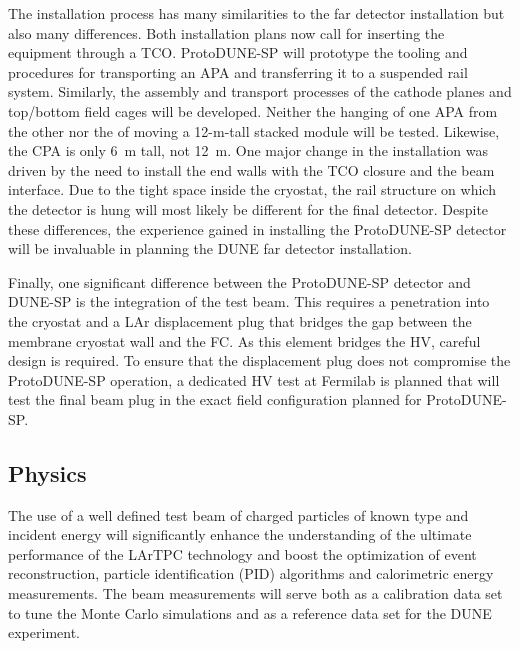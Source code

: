 
The installation process has many similarities to the far detector installation but also many differences. Both installation plans now call for inserting the equipment through a TCO. ProtoDUNE-SP will prototype the tooling and procedures for transporting an APA and transferring it to a suspended rail system. Similarly, the assembly and transport processes of the cathode planes and top/bottom field cages will be developed. %
Neither the hanging of one APA from the other nor the %
of moving a 12-m-tall stacked module %
will be tested. Likewise, the CPA is only 6~m tall, not 12~m. One major change in the installation was %
driven by the need to install the end walls with the TCO closure and the beam interface. 
Due to the tight space inside the cryostat, the rail structure on which the detector is hung will most likely be different for the final detector. Despite these differences, the experience gained in installing the ProtoDUNE-SP detector will be invaluable in planning the DUNE far detector installation. 

Finally, one significant difference between the ProtoDUNE-SP detector and DUNE-SP is the integration of the test beam. This requires a penetration into the cryostat and a LAr displacement plug that bridges the gap between the membrane cryostat wall and the FC. As this element bridges the HV, careful design is required. To ensure that the displacement plug does not compromise the ProtoDUNE-SP operation, a dedicated HV test at Fermilab is planned that will test the final beam plug in the exact field configuration planned for ProtoDUNE-SP.

\subsection{Physics}


The use of a well defined test beam of charged particles of known type and incident  energy will significantly enhance the understanding of the ultimate performance of the LArTPC technology and boost the optimization of event reconstruction, particle identification (PID) algorithms and calorimetric energy measurements.  The beam measurements will serve both as a calibration data set to tune the Monte Carlo simulations and as a reference data set for the DUNE experiment. 

